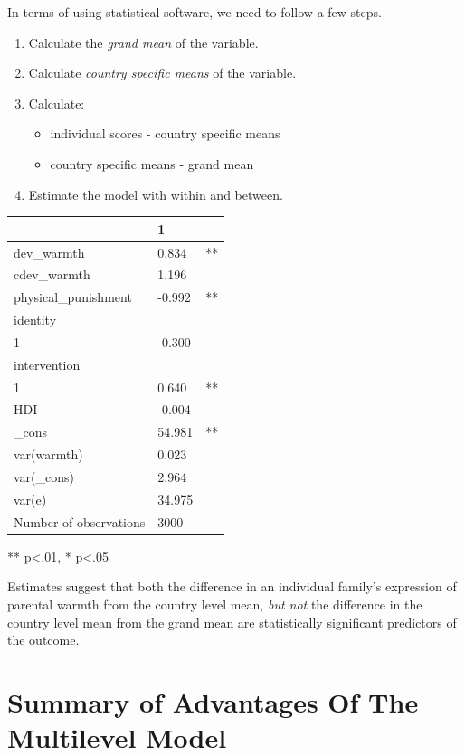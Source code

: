 \documentclass[
  letterpaper,
  DIV=11,
  numbers=noendperiod]{scrreprt}
\providecommand{\tightlist}{%
  \setlength{\itemsep}{0pt}\setlength{\parskip}{0pt}}\usepackage{longtable,booktabs,array}
\begin{document}
In terms of using statistical software, we need to follow a few steps.

\begin{enumerate}
\def\labelenumi{\arabic{enumi}.}
\item
  Calculate the \emph{grand mean} of the variable.
\item
  Calculate \emph{country specific means} of the variable.
\item
  Calculate:

  \begin{itemize}
  \tightlist
  \item
    individual scores - country specific means
  \item
    country specific means - grand mean
  \end{itemize}
\item
  Estimate the model with within and between.
\end{enumerate}

\begin{longtable}[]{@{}lll@{}}
\toprule\noalign{}
& 1 & \\
\midrule\noalign{}
\endhead
\bottomrule\noalign{}
\endlastfoot
dev\_warmth & 0.834 & ** \\
cdev\_warmth & 1.196 & \\
physical\_punishment & -0.992 & ** \\
identity & & \\
1 & -0.300 & \\
intervention & & \\
1 & 0.640 & ** \\
HDI & -0.004 & \\
\_cons & 54.981 & ** \\
var(warmth) & 0.023 & \\
var(\_cons) & 2.964 & \\
var(e) & 34.975 & \\
Number of observations & 3000 & \\
\end{longtable}

** p\textless.01, * p\textless.05

Estimates suggest that both the difference in an individual family's
expression of parental warmth from the country level mean, \emph{but
not} the difference in the country level mean from the grand mean are
statistically significant predictors of the outcome.

\section{Summary of Advantages Of The Multilevel
Model}\label{summary-of-advantages-of-the-multilevel-model}
\end{document}
